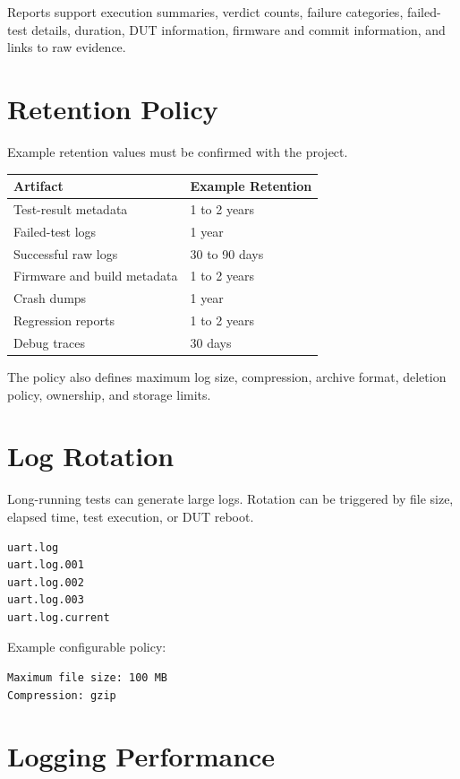 \documentclass[
  11pt,
  letterpaper,
  DIV=11,
  numbers=noendperiod]{scrartcl}
\newcounter{none} %
\begin{document}
Reports support execution summaries, verdict counts, failure categories,
failed-test details, duration, DUT information, firmware and commit
information, and links to raw evidence.

\section{Retention Policy}\label{retention-policy}

Example retention values must be confirmed with the project.

{\def\LTcaptype{none} %
\begin{longtable}[]{@{}ll@{}}
\toprule\noalign{}
Artifact & Example Retention \\
\midrule\noalign{}
\endhead
\bottomrule\noalign{}
\endlastfoot
Test-result metadata & 1 to 2 years \\
Failed-test logs & 1 year \\
Successful raw logs & 30 to 90 days \\
Firmware and build metadata & 1 to 2 years \\
Crash dumps & 1 year \\
Regression reports & 1 to 2 years \\
Debug traces & 30 days \\
\end{longtable}
}

The policy also defines maximum log size, compression, archive format,
deletion policy, ownership, and storage limits.

\section{Log Rotation}\label{log-rotation}

Long-running tests can generate large logs. Rotation can be triggered by
file size, elapsed time, test execution, or DUT reboot.

\begin{verbatim}
uart.log
uart.log.001
uart.log.002
uart.log.003
uart.log.current
\end{verbatim}

Example configurable policy:

\begin{verbatim}
Maximum file size: 100 MB
Compression: gzip
\end{verbatim}

\section{Logging Performance}\label{logging-performance}
\end{document}
